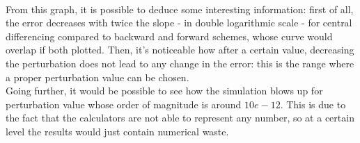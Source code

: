 \\[4pt] From this graph, it is possible to deduce some interesting information: first of all, the error decreases with twice the slope - in double logarithmic scale - for central differencing compared to backward and forward schemes, whose curve would overlap if both plotted. Then, it's noticeable how after a certain value, decreasing the perturbation does not lead to any change in the error: this is the range where a proper perturbation value can be chosen. \\[6pt]
Going further, it would be possible to see how the simulation blows up for perturbation value whose order of magnitude is around $10e-12$. This is due to the fact that the calculators are not able to represent any number, so at a certain level the results would just contain numerical waste.